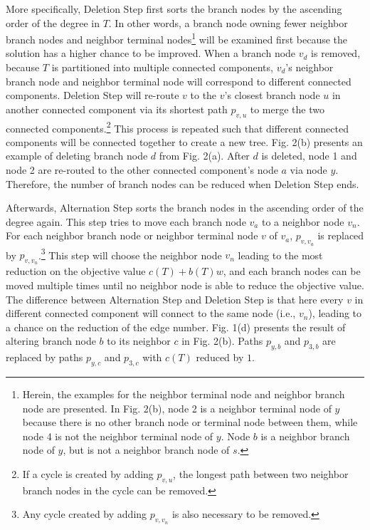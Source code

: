 \documentclass[conference]{IEEEtran}
\begin{document}
More specifically, Deletion Step first sorts the branch nodes by the ascending order of the
degree in $T$. In other words, a branch node owning fewer neighbor branch
nodes and neighbor terminal nodes\footnote{Herein, the examples for the neighbor terminal node and neighbor branch node are presented. In Fig. 2(b), node 2 is a neighbor terminal node of $y$ because there is
no other branch node or terminal node between them, while node 4 is not the neighbor terminal node of $y$. Node $b$ is a neighbor branch node of $y$, but is not a neighbor branch node of $s$.}
will be examined first because the solution has a higher chance to be
improved.
When a branch node $v_{d}$ is removed, because $T$ is partitioned into multiple connected components, $v_{d}$'s neighbor branch node and neighbor terminal node will correspond to different
connected components.
Deletion Step will re-route $v$ to the $v$'s closest branch node $u$ in another connected component via its shortest path $p_{v,u}$ to merge the two
connected components.\footnote{If a cycle is created by adding $p_{v,u}$, the longest path between two
neighbor branch nodes in the cycle can be removed.} This process is repeated
such that different connected components will be connected together to
create a new tree.
Fig. 2(b) presents an example of deleting branch node $d$ from Fig. 2(a).
After $d$ is deleted, node 1 and node 2 are re-routed to the other connected component's node $a$ via node $y$. Therefore, the number of
branch nodes can be reduced when Deletion Step ends.

Afterwards, Alternation Step sorts the branch nodes in the ascending order
of the degree again. This step tries to move each branch node $v_{a}$ to a
neighbor node $v_{n}$. For each neighbor branch node or neighbor terminal
node $v$ of $v_{a}$, $p_{v,v_{a}}$ is replaced by $p_{v,v_{n}}$.\footnote{Any cycle created by adding $p_{v,v_{n}}$ is also necessary to be removed.}
This step will choose the neighbor node $v_{n}$ leading to the most
reduction on the objective value $c(T)+b(T)w$, and each branch nodes can be
moved multiple times until no neighbor node is able to reduce the objective
value. The difference between Alternation Step and Deletion Step is that
here every $v$ in different connected component will connect to the same
node (i.e., $v_{n}$), leading to a chance on the reduction of the edge
number. {Fig. 1(d) presents the result of altering branch node }$b$ to its
neighbor $c$ in Fig. 2(b). Paths $p_{y,b}$ and $p_{3,b}$ are replaced by
paths $p_{y,c}$ and $p_{3,c}$ with $c(T)$ reduced by $1$.
\end{document}
